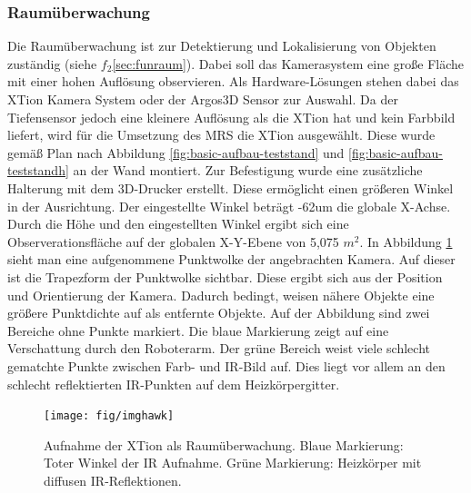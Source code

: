 \subsubsection{Raumüberwachung}
Die Raumüberwachung ist zur Detektierung und Lokalisierung von Objekten zuständig (siehe $f_2$\ref{sec:funraum}). Dabei soll das Kamerasystem eine große Fläche mit einer hohen Auflösung observieren. Als Hardware-Lösungen stehen dabei das XTion Kamera System oder der Argos3D Sensor zur Auswahl. Da der Tiefensensor jedoch eine kleinere Auflösung als die XTion hat und kein Farbbild liefert, wird für die Umsetzung des MRS die XTion ausgewählt. Diese wurde gemäß Plan nach Abbildung \ref{fig:basic-aufbau-teststand} und \ref{fig:basic-aufbau-teststandh} an der Wand montiert. Zur Befestigung wurde eine zusätzliche Halterung mit dem 3D-Drucker erstellt. Diese ermöglicht einen größeren Winkel in der Ausrichtung. Der eingestellte Winkel beträgt -62\textdegree um die globale X-Achse. Durch die Höhe und den eingestellten Winkel ergibt sich eine Observerationsfläche auf der globalen X-Y-Ebene von 5,075 $m^2$. In Abbildung \ref{fig:imghawk} sieht man eine aufgenommene Punktwolke der angebrachten Kamera. Auf dieser ist die Trapezform der Punktwolke  sichtbar. Diese ergibt sich aus der Position und Orientierung der Kamera. Dadurch bedingt, weisen nähere Objekte eine größere Punktdichte auf als entfernte Objekte. Auf der Abbildung sind zwei Bereiche ohne Punkte markiert. Die blaue Markierung zeigt auf eine Verschattung durch den Roboterarm. Der grüne Bereich weist viele schlecht gematchte Punkte zwischen Farb- und IR-Bild auf. Dies liegt vor allem an den schlecht reflektierten IR-Punkten auf dem Heizkörpergitter.

\begin{figure}
	\centering
	\texttt{[image: fig/imghawk]}
	\caption[Raumüberwachung Aufnahme]{Aufnahme der XTion als Raumüberwachung. Blaue Markierung: Toter Winkel der IR Aufnahme. Grüne Markierung: Heizkörper mit diffusen IR-Reflektionen.}
	\label{fig:imghawk}
\end{figure}

